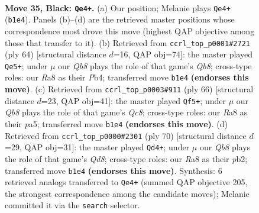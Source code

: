 \documentclass[11pt]{article}
\begin{document}
\clearpage

\begin{figure}[p]\centering
\begin{subfigure}{0.46\textwidth}\centering
\resizebox{\linewidth}{!}{%
\newchessgame
\chessboard[
  setfen={r7/6Qp/3pkp2/8/pP6/6P1/P4PKP/1q6 b - - 6 35},
  showmover=false,
  pgfstyle=straightmove, color=movearrow, markmove={b1-e4}
]}
\caption{}
\end{subfigure}\hfill
\begin{subfigure}{0.46\textwidth}\centering
\resizebox{\linewidth}{!}{%
\newchessgame
\chessboard[
  setfen={1Q6/p4pkp/1p4p1/8/1P6/P2qP2P/5PK1/8 w - - 2 33},
  showmover=false,
  pgfstyle=straightmove, color=movearrow, markmove={b8-e5}
]}
\caption{}
\end{subfigure}
\\[4pt]
\begin{subfigure}{0.46\textwidth}\centering
\resizebox{\linewidth}{!}{%
\newchessgame
\chessboard[
  setfen={2Q5/2p2ppk/7p/p7/P2q4/7P/5PP1/7K w - - 4 34},
  showmover=false,
  pgfstyle=straightmove, color=movearrow, markmove={c8-f5}
]}
\caption{}
\end{subfigure}\hfill
\begin{subfigure}{0.46\textwidth}\centering
\resizebox{\linewidth}{!}{%
\newchessgame
\chessboard[
  setfen={3Q4/5pkp/4p3/5p2/5P2/6P1/PpP4q/1K6 w - - 1 36},
  showmover=false,
  pgfstyle=straightmove, color=movearrow, markmove={d8-d4}
]}
\caption{}
\end{subfigure}
\caption{\textbf{Move 35, Black: \texttt{Qe4+}.} (a) Our position; Melanie plays \texttt{Qe4+} (\texttt{b1e4}). Panels (b)--(d) are the retrieved master positions whose correspondence most drove this move (highest QAP objective among those that transfer to it). (b) Retrieved from \texttt{ccrl\_top\_p0001\#2721} (ply 64) [structural distance $d$=16, QAP obj=74]: the master played \texttt{Qe5+}; under $\mu$ our \emph{Qb8} plays the role of that game's \emph{Qb8}; cross-type roles: our \emph{R}a8 as their \emph{P}b4; transferred move \texttt{b1e4} \textbf{(endorses this move)}. (c) Retrieved from \texttt{ccrl\_top\_p0003\#911} (ply 66) [structural distance $d$=23, QAP obj=41]: the master played \texttt{Qf5+}; under $\mu$ our \emph{Qb8} plays the role of that game's \emph{Qc8}; cross-type roles: our \emph{R}a8 as their \emph{p}a5; transferred move \texttt{b1e4} \textbf{(endorses this move)}. (d) Retrieved from \texttt{ccrl\_top\_p0000\#2301} (ply 70) [structural distance $d$=29, QAP obj=31]: the master played \texttt{Qd4+}; under $\mu$ our \emph{Qb8} plays the role of that game's \emph{Qd8}; cross-type roles: our \emph{R}a8 as their \emph{p}b2; transferred move \texttt{b1e4} \textbf{(endorses this move)}. Synthesis: 6 retrieved analogs transferred to \texttt{Qe4+} (summed QAP objective 205, the strongest correspondence among the candidate moves); Melanie committed it via the \texttt{search} selector.}
\label{fig:thought-m69}
\end{figure}
\end{document}
